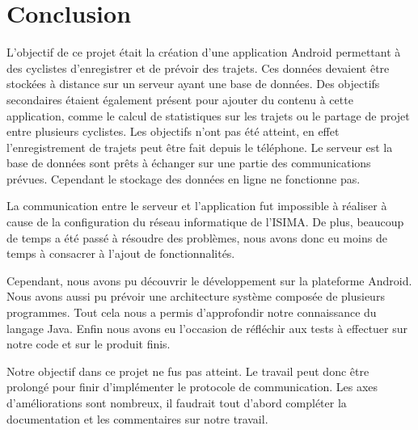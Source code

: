 \documentclass[a4paper, 12pt]{report}
\begin{document}
\section{Conclusion}
L'objectif de ce projet était la création d'une application Android permettant à des cyclistes d'enregistrer et de prévoir des trajets. Ces données devaient être stockées à distance sur un serveur ayant une base de données. Des objectifs secondaires étaient également présent pour ajouter du contenu à cette application, comme le calcul de statistiques sur les trajets ou le partage de projet entre plusieurs cyclistes.
Les objectifs n'ont pas été atteint, en effet l'enregistrement de trajets peut être fait depuis le téléphone. Le serveur est la base de données sont prêts à échanger sur une partie des communications prévues. Cependant le stockage des données en ligne ne fonctionne pas.
\par
La communication entre le serveur et l'application fut impossible à réaliser à cause de la configuration du réseau informatique de l'ISIMA. De plus, beaucoup de temps a été passé à résoudre des problèmes, nous avons donc eu moins de temps à consacrer à l'ajout de fonctionnalités.
\par
Cependant, nous avons pu découvrir le développement sur la plateforme Android. Nous avons aussi pu prévoir une architecture système composée de plusieurs programmes. Tout cela nous a permis d'approfondir notre connaissance du langage Java. Enfin nous avons eu l'occasion de réfléchir aux tests à effectuer sur notre code et sur le produit finis.
\par
Notre objectif dans ce projet ne fus pas atteint. Le travail peut donc être prolongé pour finir d'implémenter le protocole de communication. Les axes d'améliorations sont nombreux, il faudrait tout d'abord compléter la documentation et les commentaires sur notre travail.
\newpage

\newpage

\end{document}
